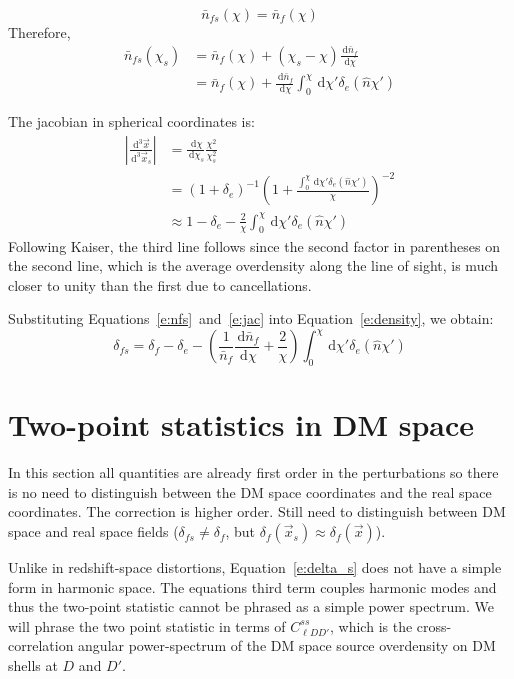 \documentclass[onecolumn,prd,nofootinbib]{revtex4-1}
\newcommand{\ud}{\,\mathrm{d}}
\begin{document}
\begin{equation}
\bar{n}_{fs}(\chi) = \bar{n}_f(\chi)
\end{equation}
Therefore,
\begin{align}
\bar{n}_{fs}(\chi_s) 
    &= \bar{n}_{f}(\chi) + (\chi_s - \chi)\frac{\ud \bar{n}_f}{\ud \chi}\\
    &= \bar{n}_{f}(\chi)
       + \frac{\ud \bar{n}_f}{\ud \chi}\int_0^\chi \ud \chi' \delta_e(\hat n \chi')
       \label{e:nfs}
\end{align}

The jacobian in spherical coordinates is:
\begin{align}
\left| \frac{\ud^3\vec x}{\ud^3\vec x_s} \right|
    &= \frac{\ud \chi}{\ud \chi_s}\frac{\chi^2}{\chi_s^2}\\
    &= (1 + \delta_e)^{-1}
       \left(1 + \frac{\int_0^\chi \ud \chi' \delta_e(\hat n \chi')}
                      {\chi}\right)^{-2}\\
    &\approx 1 - \delta_e
        - \frac{2}{\chi}\int_0^\chi \ud \chi' \delta_e(\hat n \chi')
        \label{e:jac}
\end{align}
Following Kaiser, the third line follows since the
second factor in parentheses on the second line, which is the
average overdensity along the line of sight, is much
closer to unity than the first due to cancellations.

Substituting Equations~\ref{e:nfs}~and~\ref{e:jac} into Equation~\ref{e:density},
we obtain:
\begin{equation}
\label{e:delta_s}
    \delta_{fs} = \delta_f - \delta_e
    - \left(\frac{1}{\bar{n}_f}\frac{\ud \bar{n}_f}{\ud \chi}
    + \frac{2}{\chi} \right)
        \int_0^\chi \ud \chi' \delta_e(\hat n \chi')
\end{equation}

\section{Two-point statistics in DM space}

In this section all quantities are already first order in the perturbations so
there is no need to distinguish between the DM space coordinates and the real
space coordinates. The correction is higher order. Still need to distinguish
between DM space and real space fields ($\delta_{fs} \neq \delta_f$, but
$\delta_f(\vec x_s) \approx \delta_f(\vec x)$).

Unlike in redshift-space distortions, Equation~\ref{e:delta_s} does not have a
simple form in harmonic space. The equations third term couples harmonic modes
and thus the two-point statistic cannot be phrased as a simple power spectrum.
We will phrase the two point statistic in terms of $C^{ss}_{\ell D D'}$, which is
the cross-correlation angular power-spectrum of the DM space source overdensity
on DM shells at $D$ and $D'$.
\end{document}
